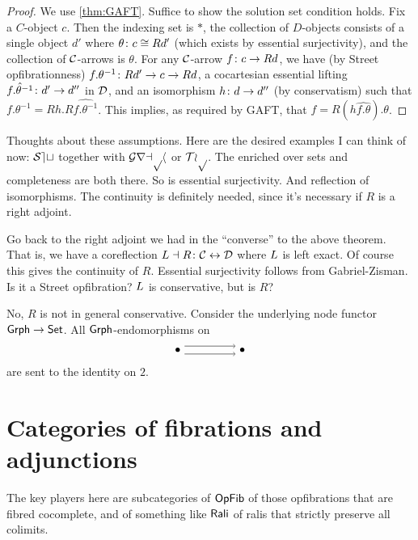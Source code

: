 \documentclass{amsart}
\begin{document}
\begin{proof}
	We use \ref{thm:GAFT}.  Suffice to show the solution set condition holds.  Fix a $ C $-object $ c $.  Then the indexing set is $ \ast $, the collection of $ D $-objects consists of a single object $ d' $ where $ \theta \colon c \cong Rd' $ (which exists by essential surjectivity), and the collection of $ \mathcal{C} $-arrows is $ { \theta } $.  For any $ \mathcal{C} $-arrow $ f \colon c \to Rd $, we have (by Street opfibrationness) $ f . \theta^{-1} \colon Rd' \to c \to Rd $, a cocartesian essential lifting $ \hat{ f . \theta^{-1} } \colon d' \to d'' $ in $ \mathcal{D} $, and an isomorphism $ h \colon d \to d'' $ (by conservatism) such that $ f . \theta^{-1} = Rh . R \hat{ f . \theta^{-1} } $.  This implies, as required by GAFT, that $ f = R (h\hat{ f . \theta }) . \theta $.
\end{proof}

Thoughts about these assumptions. Here are the desired examples I can think of now: $ \mathcal{Set} $ together with $ \mathcal{Graph} $ or $ \mathcal{Top} $. The enriched over sets and completeness are both there. So is essential surjectivity. And reflection of isomorphisms.  The continuity is definitely needed, since it's necessary if $ R $ is a right adjoint. 

Go back to the right adjoint we had in the ``converse'' to the above theorem.  That is, we have a coreflection $ L \dashv R \colon \mathcal{C} \leftrightarrow \mathcal{D} $ where $ L $ is left exact.  Of course this gives the continuity of $ R $. Essential surjectivity follows from Gabriel-Zisman. Is it a Street opfibration? $ L $ is conservative, but is $ R $?

\begin{ex}
  No, $ R $ is not in general conservative.
  Consider the underlying node functor
  $ \mathsf{Grph} \to \mathsf{Set} $.  All $ \mathsf{Grph} $-endomorphisms
  on
  \[
    \begin{tikzpicture}
      \node (a) at (0,0) {$ \bullet $};
      \node (b) at (2,0) {$ \bullet $};
      \draw [->] (a.30) to (b.150);
      \draw [->] (a.-30) to (b.-150);
    \end{tikzpicture}
  \]
  are sent to the identity on $ 2 $.
\end{ex}

\section{Categories of fibrations and adjunctions}

The key players here are subcategories of $\mathsf{OpFib}$ of those opfibrations that are fibred cocomplete, and of something like
$\mathsf{Rali}$ of ralis that strictly preserve all colimits.
\end{document}
